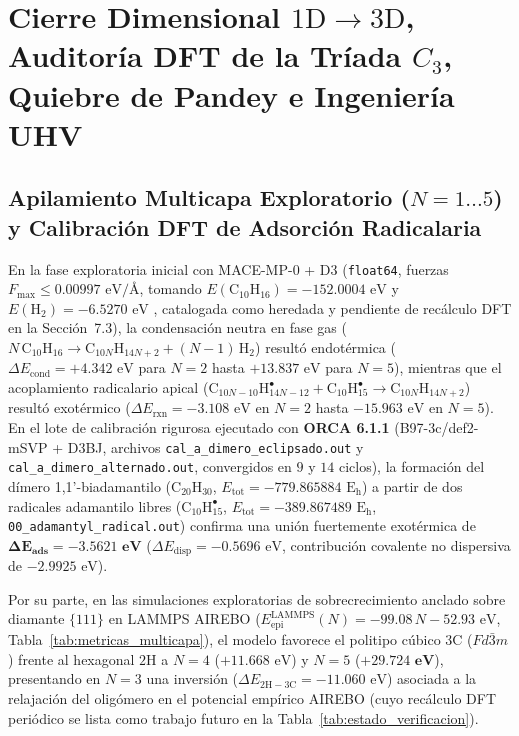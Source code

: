 \documentclass[10pt,twocolumn,a4paper]{article}
\begin{document}
\section{Cierre Dimensional $1\text{D} \to 3\text{D}$, Auditoría DFT de la Tríada $C_3$, Quiebre de Pandey e Ingeniería UHV}

\subsection{Apilamiento Multicapa Exploratorio ($N=1\dots5$) y Calibración DFT de Adsorción Radicalaria}
En la fase exploratoria inicial con MACE-MP-0 + D3 (\texttt{float64}, fuerzas $F_{\text{max}} \le 0.00997\text{ eV/\AA}$, tomando $E(\text{C}_{10}\text{H}_{16}) = -152.0004\text{ eV}$ y $E(\text{H}_2) = -6.5270\text{ eV}$ \cite{Batatia2024,Grimme2010}, catalogada como heredada y pendiente de recálculo DFT en la Sección~7.3), la condensación neutra en fase gas ($N\,\text{C}_{10}\text{H}_{16} \to \text{C}_{10N}\text{H}_{14N+2} + (N-1)\,\text{H}_2$) resultó endotérmica ($\Delta E_{\text{cond}} = +4.342\text{ eV}$ para $N=2$ hasta $+13.837\text{ eV}$ para $N=5$), mientras que el acoplamiento radicalario apical ($\text{C}_{10N-10}\text{H}_{14N-12}^\bullet + \text{C}_{10}\text{H}_{15}^\bullet \to \text{C}_{10N}\text{H}_{14N+2}$) resultó exotérmico ($\Delta E_{\text{rxn}} = -3.108\text{ eV}$ en $N=2$ hasta $-15.963\text{ eV}$ en $N=5$). En el lote de calibración rigurosa ejecutado con \textbf{ORCA 6.1.1} (B97-3c/def2-mSVP + D3BJ, archivos \texttt{cal\_a\_dimero\_eclipsado.out} y \texttt{cal\_a\_dimero\_alternado.out}, convergidos en $9$ y $14$ ciclos), la formación del dímero 1,1'-biadamantilo ($\text{C}_{20}\text{H}_{30}$, $E_{\text{tot}} = -779.865884\text{ E}_\text{h}$) a partir de dos radicales adamantilo libres ($\text{C}_{10}\text{H}_{15}^\bullet$, $E_{\text{tot}} = -389.867489\text{ E}_\text{h}$, \texttt{00\_adamantyl\_radical.out}) confirma una unión fuertemente exotérmica de $\mathbf{\Delta E_{\text{ads}} = -3.5621\text{ eV}}$ ($\Delta E_{\text{disp}} = -0.5696\text{ eV}$, contribución covalente no dispersiva de $-2.9925\text{ eV}$).

Por su parte, en las simulaciones exploratorias de sobrecrecimiento anclado sobre diamante $\{111\}$ en LAMMPS AIREBO \cite{Stuart2000} ($E_{\text{epi}}^{\text{LAMMPS}}(N) = -99.08\,N - 52.93\text{ eV}$, Tabla~\ref{tab:metricas_multicapa}), el modelo favorece el politipo cúbico $3\text{C}$ ($Fd\bar{3}m$) frente al hexagonal $2\text{H}$ a $N=4$ ($+11.668\text{ eV}$) y $N=5$ ($\mathbf{+29.724\text{ eV}}$), presentando en $N=3$ una inversión ($\Delta E_{2\text{H}-3\text{C}} = -11.060\text{ eV}$) asociada a la relajación del oligómero en el potencial empírico AIREBO (cuyo recálculo DFT periódico se lista como trabajo futuro en la Tabla~\ref{tab:estado_verificacion}).
\end{document}
